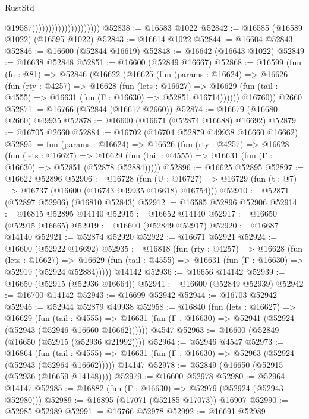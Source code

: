 \begin{lexlean}{RustStd}
\begin{coremodule}
                                              @19587)))))))))))))))))))))
@52838 := @16583 @1022
@52842 := @16585 (@16589 @1022) (@16595 @1022)
@52843 := @16614 @1022
@52844 := @16604 @52843
@52846 := @16600 (@52844 @16619)
@52848 := @16642 (@16643 @1022)
@52849 := @16638 @52848
@52851 := @16600 (@52849 @16667)
@52868 := @16599
    (fun (fn : @81) =>
    @52846
      (@16622
        (@16625
          (fun (params : @16624) =>
          @16626
            (fun (rty : @4257) =>
            @16628
              (fun (lets : @16627) =>
              @16629 (fun (tail : @4555) => @16631 (fun (Γ : @16630) => @52851 @16714))))))
        @16760))
    @2660
@52871 := @16766 (@52844 (@16617 @2660))
@52874 := @16679 (@16680 @2660) @49935
@52878 := @16600 (@16671 (@52874 @16688) @16692)
@52879 := @16705 @2660
@52884 := @16702 (@16704 @52879 @49938 @16660 @16662)
@52895 := fun (params : @16624) =>
  @16626
    (fun (rty : @4257) =>
    @16628
      (fun (lets : @16627) =>
      @16629 (fun (tail : @4555) => @16631 (fun (Γ : @16630) => @52851 (@52878 @52884)))))
@52896 := @16625 @52895
@52897 := @16622 @52896
@52906 := @16728
    (fun (U : @16727) => @16729 (fun (t : @7) => @16737 (@16600 (@16743 @49935 @16618) @16754)))
@52910 := @52871 (@52897 @52906) (@16810 @52843)
@52912 := @16585 @52896 @52906
@52914 := @16815 @52895 @14140
@52915 := @16652 @14140
@52917 := @16650 (@52915 @16665)
@52919 := @16600 (@52849 @52917)
@52920 := @16687 @14140
@52921 := @52874 @52920
@52922 := @16671 @52921
@52924 := @16600 (@52922 @16692)
@52935 := @16818
    (fun (rty : @4257) =>
    @16628
      (fun (lets : @16627) =>
      @16629 (fun (tail : @4555) => @16631 (fun (Γ : @16630) => @52919 (@52924 @52884)))))
    @14142
@52936 := @16656 @14142
@52939 := @16650 (@52915 (@52936 @16664))
@52941 := @16600 (@52849 @52939)
@52942 := @16700 @14142
@52943 := @16699 @52942
@52944 := @16703 @52942
@52946 := @52944 @52879 @49938
@52958 := @16840
    (fun (lets : @16627) =>
    @16629
      (fun (tail : @4555) =>
      @16631 (fun (Γ : @16630) => @52941 (@52924 (@52943 (@52946 @16660 @16662))))))
    @4547
@52963 := @16600 (@52849 (@16650 (@52915 (@52936 @21992))))
@52964 := @52946 @4547
@52973 := @16864
    (fun (tail : @4555) => @16631 (fun (Γ : @16630) => @52963 (@52924 (@52943 (@52964 @16662)))))
    @14147
@52978 := @52849 (@16650 (@52915 (@52936 (@16659 @14148))))
@52979 := @16600 @52978
@52980 := @52964 @14147
@52985 := @16882 (fun (Γ : @16630) => @52979 (@52924 (@52943 @52980)))
@52989 := @16895 (@17071 (@52185 @17073)) @16907
@52990 := @52985 @52989
@52991 := @16766 @52978
@52992 := @16691 @52989

\end{coremodule}
\end{lexlean}
